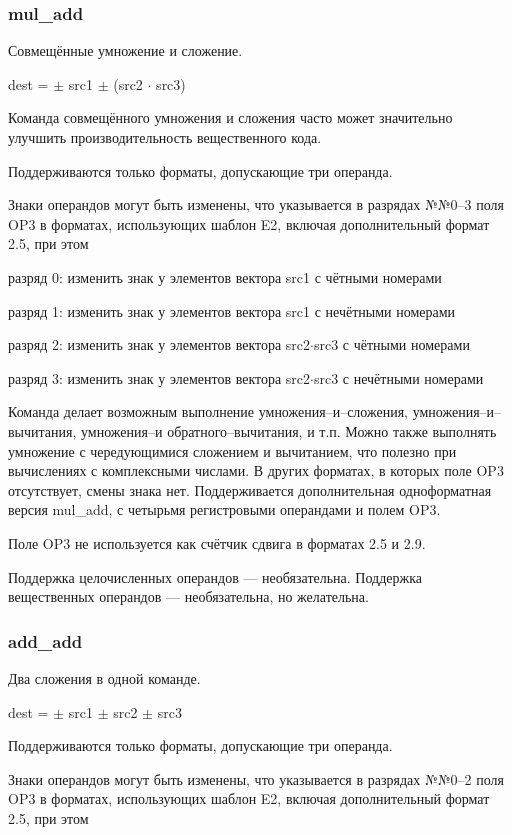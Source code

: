 \documentclass[forwardcom.tex]{subfiles}
\begin{document}
\subsubsection{mul\_add}
Совмещённые умножение и сложение.

dest = $\pm$ src1 $\pm$ (src2 $\cdot$ src3)

Команда совмещённого умножения и сложения часто может значительно улучшить производительность вещественного кода.

Поддерживаются только форматы, допускающие три операнда.

Знаки операндов могут быть изменены, что указывается в разрядах №№0--3 поля OP3 в форматах, использующих шаблон E2, включая дополнительный формат 2.5, при этом

разряд 0: изменить знак у элементов вектора src1 с чётными номерами

разряд 1: изменить знак у элементов вектора src1 с нечётными номерами

разряд 2: изменить знак у элементов вектора src2$\cdot$src3  с чётными номерами

разряд 3: изменить знак у элементов вектора src2$\cdot$src3  с нечётными номерами

Команда делает возможным выполнение умножения--и--сложения, умножения--и--вычитания, умножения--и обратного--вычитания, и т.п. Можно также выполнять умножение с чередующимися сложением и вычитанием, что полезно при вычислениях с комплексными числами. В других форматах, в которых поле OP3 отсутствует, смены знака нет. Поддерживается дополнительная одноформатная версия mul\_add, с четырьмя регистровыми операндами и полем OP3.

Поле OP3 не используется как счётчик сдвига в форматах 2.5 и 2.9.

Поддержка целочисленных операндов --- необязательна. Поддержка вещественных операндов --- необязательна, но желательна.

\subsubsection{add\_add}  \label{addAdd}
Два сложения в одной команде.

dest = $\pm$ src1 $\pm$ src2 $\pm$ src3

Поддерживаются только форматы, допускающие три операнда.

Знаки операндов могут быть изменены, что указывается в разрядах №№0--2 поля OP3 в форматах, использующих шаблон E2, включая дополнительный формат 2.5, при этом
\end{document}

